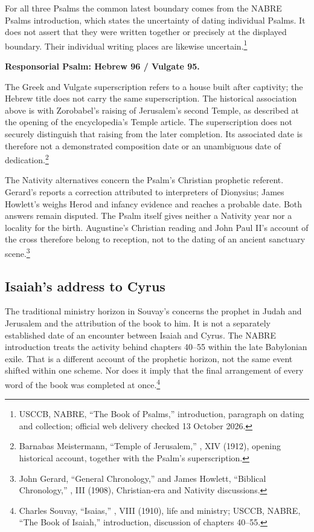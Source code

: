 For all three Psalms the common latest boundary comes from the NABRE Psalms introduction, which states the uncertainty of dating individual Psalms. It does not assert that they were written together or precisely at the displayed boundary. Their individual writing places are likewise uncertain.\footnote{USCCB, NABRE, ``The Book of Psalms,'' introduction, paragraph on dating and collection; official web delivery checked 13 October 2026.}

\textbf{Responsorial Psalm: Hebrew 96 / Vulgate 95.}

The Greek and Vulgate superscription refers to a house built after captivity; the Hebrew title does not carry the same superscription. The historical association above is with Zorobabel's raising of Jerusalem's second Temple, as described at the opening of the encyclopedia's Temple article. The superscription does not securely distinguish that raising from the later completion. Its associated date is therefore not a demonstrated composition date or an unambiguous date of dedication.\footnote{Barnabas Meistermann, ``Temple of Jerusalem,'' , XIV (1912), opening historical account, together with the Psalm's superscription.}

The Nativity alternatives concern the Psalm's Christian prophetic referent. Gerard's  reports a correction attributed to interpreters of Dionysius; James Howlett's  weighs Herod and infancy evidence and reaches a probable date. Both answers remain disputed. The Psalm itself gives neither a Nativity year nor a locality for the birth. Augustine's Christian reading and John Paul II's account of the cross therefore belong to reception, not to the dating of an ancient sanctuary scene.\footnote{John Gerard, ``General Chronology,'' and James Howlett, ``Biblical Chronology,'' , III (1908), Christian-era and Nativity discussions.}

\subsection{Isaiah's address to Cyrus}
\label{history-isaiah}

The traditional ministry horizon in Souvay's  concerns the prophet in Judah and Jerusalem and the attribution of the book to him. It is not a separately established date of an encounter between Isaiah and Cyrus. The NABRE introduction treats the activity behind chapters 40--55 within the late Babylonian exile. That is a different account of the prophetic horizon, not the same event shifted within one scheme. Nor does it imply that the final arrangement of every word of the book was completed at once.\footnote{Charles Souvay, ``Isaias,'' , VIII (1910), life and ministry; USCCB, NABRE, ``The Book of Isaiah,'' introduction, discussion of chapters 40--55.}

